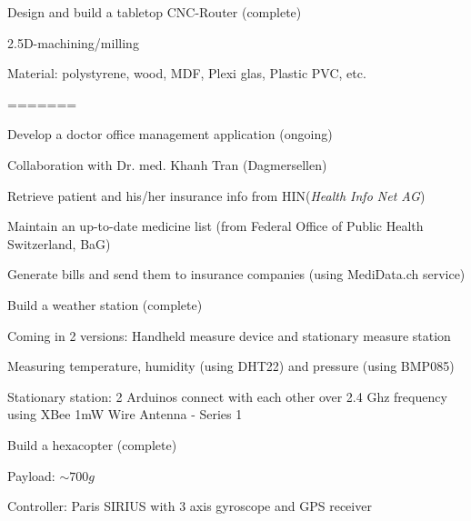 \begin{cventries}
  \cventry
    {} %
    {Design and build a tabletop CNC-Router (complete)} %
    {} %
    {} %
    {\vspace{-12pt}
      \begin{cvitems} %
        \item {2.5D-machining/milling}
        \item {Material: polystyrene, wood, MDF, Plexi glas, Plastic PVC, etc.}
      \end{cvitems}
    }

\end{cventries}
=======
	
	\cventry
	{} %
	{Develop a doctor office management application (ongoing)} %
	{} %
	{} %
	{\vspace{-12pt}
		\begin{cvitems} %
			\item {Collaboration with Dr. med. Khanh Tran (Dagmersellen)}
			\item {Retrieve patient and his/her insurance info from HIN(\textit{Health Info Net AG})}
			\item {Maintain an up-to-date medicine list (from Federal Office of Public Health Switzerland, BaG)}
			\item {Generate bills and send them to insurance companies (using MediData.ch service)}
		\end{cvitems}
	}
	
	\cventry
	{} %
	{Build a weather station (complete)} %
	{} %
	{} %
	{\vspace{-12pt}
		\begin{cvitems} %
			\item {Coming in 2 versions: Handheld measure device and stationary measure station}
			\item {Measuring temperature, humidity (using DHT22) and pressure (using BMP085)}
			\item {Stationary station: 2 Arduinos connect with each other over 2.4 Ghz frequency using XBee 1mW Wire Antenna - Series 1}
		\end{cvitems}
	}
	
	\cventry
	{} %
	{Build a hexacopter (complete)} %
	{} %
	{} %
	{\vspace{-12pt}
		\begin{cvitems} %
			\item {Payload: $ \sim 700g$}
			\item {Controller: Paris SIRIUS with 3 axis gyroscope and GPS receiver}
		\end{cvitems}
	}
	
